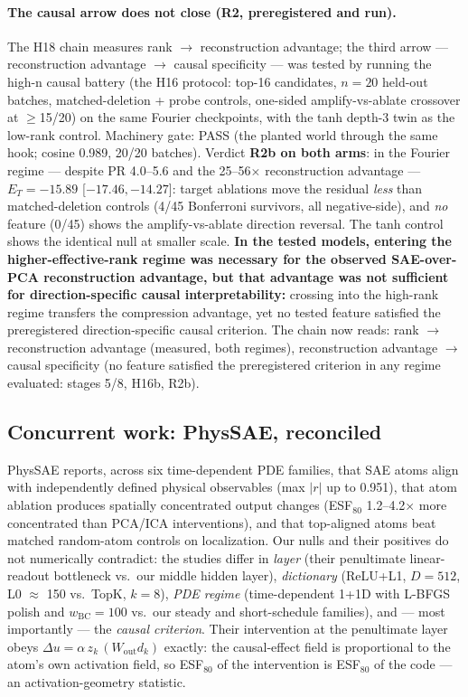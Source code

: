 \documentclass{article}
\newcommand{\ET}{E_T}
\begin{document}
\paragraph{The causal arrow does not close (R2, preregistered and
run).} The H18 chain measures rank $\to$ reconstruction advantage; the
third arrow --- reconstruction advantage $\to$ causal specificity ---
was tested by running the high-n causal battery (the H16 protocol:
top-16 candidates, $n{=}20$ held-out batches, matched-deletion +
probe controls, one-sided amplify-vs-ablate crossover at
$\ge$15/20) on the same Fourier checkpoints, with the tanh depth-3
twin as the low-rank control. Machinery gate: PASS (the planted world
through the same hook; cosine 0.989, 20/20 batches). Verdict
\textbf{R2b on both arms}: in the Fourier regime --- despite PR
4.0--5.6 and the 25--56$\times$ reconstruction advantage ---
$\ET = -15.89$ [$-17.46, -14.27$]: target ablations move the residual
\emph{less} than matched-deletion controls (4/45 Bonferroni survivors,
all negative-side), and \emph{no} feature (0/45) shows the
amplify-vs-ablate direction reversal. The tanh control shows the
identical null at smaller scale. \textbf{In the tested models,
entering the higher-effective-rank regime was necessary for the observed
SAE-over-PCA reconstruction advantage, but that advantage was not
sufficient for direction-specific causal interpretability:} crossing
into the high-rank regime transfers the compression advantage, yet no
tested feature satisfied the preregistered direction-specific causal
criterion. The chain now reads: rank $\to$ reconstruction advantage
(measured, both regimes), reconstruction advantage $\to$ causal
specificity (no feature satisfied the preregistered criterion in any
regime evaluated: stages 5/8, H16b, R2b).

\subsection{Concurrent work: PhysSAE, reconciled}
\label{sec:reconciliation}

PhysSAE \cite{patil2026physSAE} reports, across six time-dependent PDE
families, that SAE atoms align with independently defined physical
observables (max $|r|$ up to 0.951), that atom ablation produces spatially
concentrated output changes (ESF$_{80}$ 1.2--4.2$\times$ more
concentrated than PCA/ICA interventions), and that top-aligned atoms
beat matched random-atom controls on localization. Our nulls and their
positives do not numerically contradict: the studies differ in
\emph{layer} (their penultimate linear-readout bottleneck vs.\ our
middle hidden layer), \emph{dictionary} (ReLU+L1, $D{=}512$, L0
$\approx$ 150 vs.\ TopK, $k{=}8$), \emph{PDE regime} (time-dependent
1+1D with L-BFGS polish and $w_{\mathrm{BC}}{=}100$ vs.\ our steady and
short-schedule families), and --- most importantly --- the
\emph{causal criterion}. Their intervention at the penultimate layer
obeys $\Delta u = \alpha\, z_k\, (W_{\mathrm{out}} d_k)$ exactly: the
causal-effect field is proportional to the atom's own activation field,
so ESF$_{80}$ of the intervention is ESF$_{80}$ of the code --- an
activation-geometry statistic.
\end{document}
